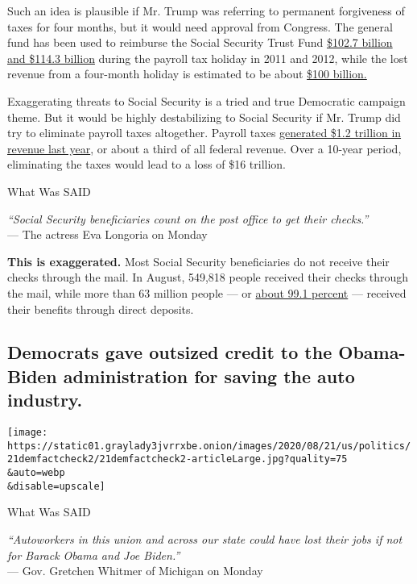 Such an idea is plausible if Mr. Trump was referring to permanent
forgiveness of taxes for four months, but it would need approval from
Congress. The general fund has been used to reimburse the Social
Security Trust Fund
\href{https://fas.org/sgp/crs/misc/RL33028.pdf\#page=15}{\$102.7 billion
and \$114.3 billion} during the payroll tax holiday in 2011 and 2012,
while the lost revenue from a four-month holiday is estimated to be
about
\href{https://www.crfb.org/blogs/how-much-would-president-trumps-executive-orders-cost}{\$100
billion.}

Exaggerating threats to Social Security is a tried and true Democratic
campaign theme. But it would be highly destabilizing to Social Security
if Mr. Trump did try to eliminate payroll taxes altogether. Payroll
taxes \href{https://www.cbo.gov/data/budget-economic-data\#7}{generated
\$1.2 trillion in revenue last year}, or about a third of all federal
revenue. Over a 10-year period, eliminating the taxes would lead to a
loss of \$16 trillion.

What Was SAID

\emph{``Social Security beneficiaries count on the post office to get
their checks.''}\\
--- The actress Eva Longoria on Monday

\textbf{This is exaggerated.} Most Social Security beneficiaries do not
receive their checks through the mail. In August, 549,818 people
received their checks through the mail, while more than 63 million
people --- or \href{https://www.ssa.gov/deposit/T2StateSum_a.htm}{about
99.1 percent} --- received their benefits through direct deposits.

\hypertarget{democrats-gave-outsized-credit-to-the-obama-biden-administration-for-saving-the-auto-industry}{%
\subsection{Democrats gave outsized credit to the Obama-Biden
administration for saving the auto
industry.}\label{democrats-gave-outsized-credit-to-the-obama-biden-administration-for-saving-the-auto-industry}}

\texttt{[image: https://static01.graylady3jvrrxbe.onion/images/2020/08/21/us/politics/21demfactcheck2/21demfactcheck2-articleLarge.jpg?quality=75\\\&auto=webp\\\&disable=upscale]}

What Was SAID

\emph{``Autoworkers in this union and across our state could have lost
their jobs if not for Barack Obama and Joe Biden.''}\\
--- Gov. Gretchen Whitmer of Michigan on Monday

